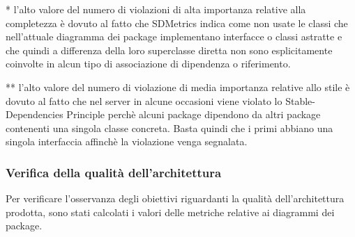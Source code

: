 		* l'alto valore del numero di violazioni di alta importanza relative alla completezza è dovuto al fatto che SDMetrics indica come non usate le classi che nell'attuale diagramma dei package implementano interfacce o classi astratte e che quindi a differenza della loro superclasse diretta non sono esplicitamente coinvolte in alcun tipo di associazione di dipendenza o riferimento.
		
		** l'alto valore del numero di violazione di media importanza relative allo stile è dovuto al fatto che nel server in alcune occasioni viene violato lo Stable-Dependencies Principle perchè alcuni package dipendono da altri package contenenti una singola classe concreta. Basta quindi che i primi abbiano una singola interfaccia affinchè la violazione venga segnalata.

		\subsubsection{Verifica della qualità dell'architettura}
		Per verificare l'osservanza degli obiettivi riguardanti la qualità dell'architettura prodotta, sono stati calcolati i valori delle metriche relative ai diagrammi dei package.
		
